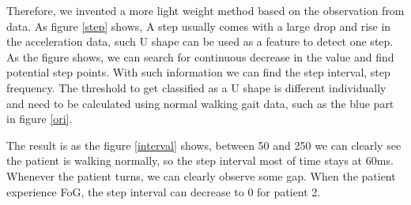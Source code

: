 \documentclass[article]{article}
\begin{document}
\begin{enumerate}
		Therefore, we invented a more light weight method based on the observation from data. As figure \ref{step} shows, A step usually comes with a large drop and rise in the acceleration data, such U shape can be used as a feature to detect one step. As the figure shows, we can search for continuous decrease in the value and find potential step points. With such information we can find the step interval, step frequency. The threshold to get classified as a U shape is different individually and need to be calculated using normal walking gait data, such as the blue part in figure \ref{ori}.
		
		The result is as the figure \ref{interval} shows, between 50 and 250 we can clearly see the patient is walking normally, so the step interval most of time stays at 60ms. Whenever the patient turns, we can clearly observe some gap. When the patient experience FoG, the step interval can decrease to 0 for patient 2.	

	\end{enumerate}
\end{document}
